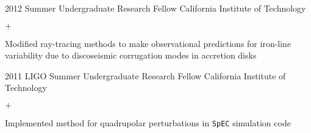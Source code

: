 \documentclass[]{luger-cv} %
\begin{document}
\begin{entrylist}
\ifdefined \onepage \else
\entry
{2012}
{Summer Undergraduate Research Fellow}
{California Institute of Technology}
{%
\vspace{-1em}
\begin{list}{$+$}{\cvlist}
\item Modified ray-tracing methods to make observational predictions for iron-line variability due to discoseismic corrugation modes in accretion disks
\end{list}
}


\ifdefined \onepage \else
\entry
{2011}
{LIGO Summer Undergraduate Research Fellow}
{California Institute of Technology}
{%
\vspace{-1em}
\begin{list}{$+$}{\cvlist}
\item Implemented method for quadrupolar perturbations in \texttt{SpEC} simulation code
\end{list}
}
\fi


\end{entrylist}

\end{document}
